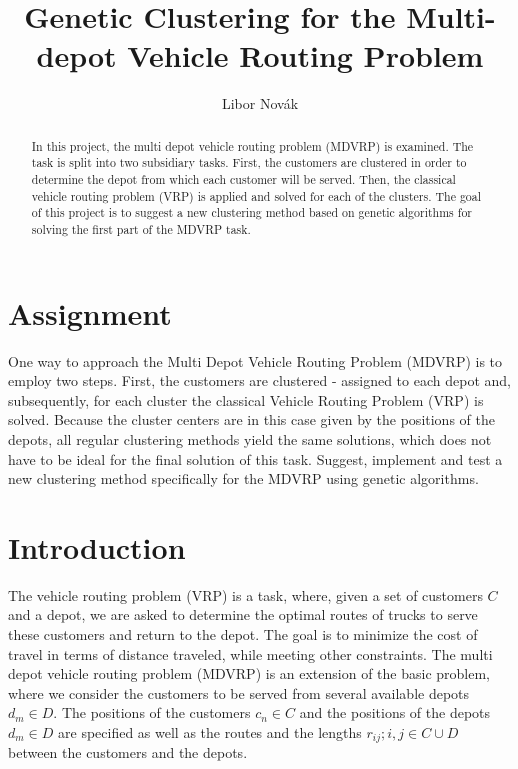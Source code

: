 \documentclass[conference]{IEEEtran}
\begin{document}
\title{Genetic Clustering for the Multi-depot Vehicle Routing Problem}
\author{Libor Novák}

\maketitle

\begin{abstract}
In this project, the multi depot vehicle routing problem (MDVRP) is examined. The task is split into two subsidiary tasks. First, the customers are clustered in order to determine the depot from which each customer will be served. Then, the classical vehicle routing problem (VRP) is applied and solved for each of the clusters. The goal of this project is to suggest a new clustering method based on genetic algorithms for solving the first part of the MDVRP task.
\end{abstract}

\IEEEpeerreviewmaketitle


\section{Assignment}
One way to approach the Multi Depot Vehicle Routing Problem (MDVRP) is to employ two steps. First, the customers are clustered - assigned to each depot and, subsequently, for each cluster the classical Vehicle Routing Problem (VRP) is solved. Because the cluster centers are in this case given by the positions of the depots, all regular clustering methods yield the same solutions, which does not have to be ideal for the final solution of this task. Suggest, implement and test a new clustering method specifically for the MDVRP using genetic algorithms.



\section{Introduction}
The vehicle routing problem (VRP) is a task, where, given a set of customers $C$ and a depot, we are asked to determine the optimal routes of trucks to serve these customers and return to the depot. The goal is to minimize the cost of travel in terms of distance traveled, while meeting other constraints. The multi depot vehicle routing problem (MDVRP) is an extension of the basic problem, where we consider the customers to be served from several available depots $d_m \in D$. The positions of the customers $c_n \in C$ and the positions of the depots $d_m \in D$ are specified as well as the routes and the lengths $r_{ij}; i,j \in C \cup D$ between the customers and the depots.
\end{document}
